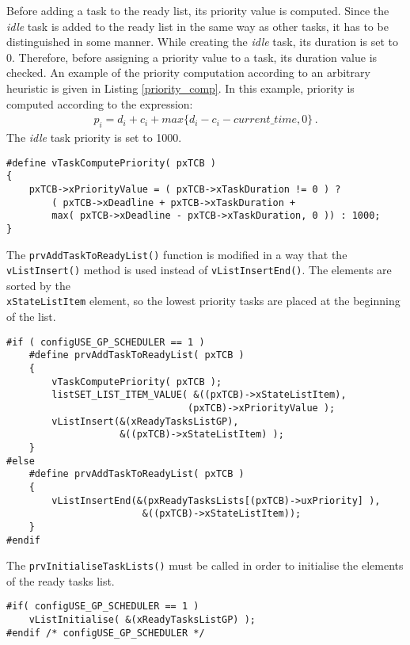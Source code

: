 Before adding a task to the ready list, its priority value is computed. 
Since the \textit{idle} task is added to the ready list in the same way as other tasks, it has to be distinguished in some manner. 
While creating the \textit{idle} task, its duration is set to 0.
Therefore, before assigning a priority value to a task, its duration value is checked. 
An example of the priority computation according to an arbitrary heuristic is given in Listing \ref{priority_comp}. 
In this example, priority is computed according to the expression:
\begin{align*}
p_i = d_i + c_i + max\{ d_i - c_i - current\_time, 0 \} \, .
\end{align*}
The \textit{idle} task priority is set to 1000.
\begin{lstlisting}[frame=none, label={priority_comp}, caption={Macro function for priority computation.}, captionpos=b]
#define vTaskComputePriority( pxTCB )
{
	pxTCB->xPriorityValue = ( pxTCB->xTaskDuration != 0 ) ? 
		( pxTCB->xDeadline + pxTCB->xTaskDuration + 
		max( pxTCB->xDeadline - pxTCB->xTaskDuration, 0 )) : 1000;
}	
\end{lstlisting}
The \verb$prvAddTaskToReadyList()$ function is modified in a way that the \verb$vListInsert()$ method is used instead of \verb$vListInsertEnd()$. 
The elements are sorted by the \\\verb$xStateListItem$ element, so the lowest priority tasks are placed at the beginning of the list. 
\begin{lstlisting}[frame=none, label={ready_add}, caption={Adding a new task to the ready list.}, captionpos=b]
#if ( configUSE_GP_SCHEDULER == 1 )
	#define prvAddTaskToReadyList( pxTCB )
	{
		vTaskComputePriority( pxTCB );
		listSET_LIST_ITEM_VALUE( &((pxTCB)->xStateListItem), 
								(pxTCB)->xPriorityValue );
		vListInsert(&(xReadyTasksListGP), 
					&((pxTCB)->xStateListItem) );
	}																								
#else 																								
	#define prvAddTaskToReadyList( pxTCB )
	{
		vListInsertEnd(&(pxReadyTasksLists[(pxTCB)->uxPriority] ), 
						&((pxTCB)->xStateListItem));
	}
#endif
\end{lstlisting}
The \verb$prvInitialiseTaskLists()$ must be called in order to initialise the elements of the ready tasks list.
\begin{lstlisting}[frame=none, label={init_lists}, caption={Initialization of the tasks in the \texttt{ready} list.}, captionpos=b]
#if( configUSE_GP_SCHEDULER == 1 )
	vListInitialise( &(xReadyTasksListGP) );
#endif /* configUSE_GP_SCHEDULER */
\end{lstlisting}
